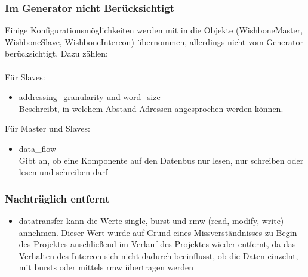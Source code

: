\documentclass{article}
\begin{document}
\subsubsection{Im Generator nicht Berücksichtigt}
Einige Konfigurationsmöglichkeiten werden mit in die Objekte (WishboneMaster, WishboneSlave, WishboneIntercon) übernommen, allerdings nicht vom Generator berücksichtigt. Dazu zählen:\\\\
Für Slaves:
\begin{itemize}
\item addressing\_granularity und word\_size\\
Beschreibt, in welchem Abstand Adressen angesprochen werden können.\\
\noindent
{}
\end{itemize}
Für Master und Slaves:
\begin{itemize}
\item data\_flow\\
Gibt an, ob eine Komponente auf den Datenbus nur lesen, nur schreiben oder lesen und schreiben darf
\end{itemize}
\subsubsection{Nachträglich entfernt}
\begin{itemize}
\item datatransfer
kann die Werte single, burst und rmw (read, modify, write) annehmen. Dieser Wert wurde auf Grund eines Missverständnisses zu Begin des Projektes anschließend im Verlauf des Projektes wieder entfernt, da das Verhalten des Intercon sich nicht dadurch beeinflusst, ob die Daten einzelnt, mit bursts oder mittels rmw übertragen werden
\end{itemize}
\end{document}
